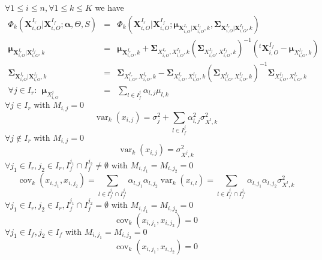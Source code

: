 \documentclass[11pt,a4paper]{report}
\begin{document}
		
		$\forall 1\leq i \leq n, \forall 1\leq k \leq K$ we have
\begin{eqnarray}
		\Phi_k(\boldsymbol{X}^{I_r}_{i,O}|\boldsymbol{X}^{I_f}_{i,O};\boldsymbol{\alpha},\Theta,S)&=&\Phi_k(\boldsymbol{X}^{I_r}_{i,O}|\boldsymbol{X}^{I_f}_{i,O};\boldsymbol{\mu}_{\boldsymbol{X}^{I_r}_{i,O}|\boldsymbol{X}^{I_f}_{i,O},k},\boldsymbol{\Sigma}_{\boldsymbol{X}^{I_r}_{i,O}|\boldsymbol{X}^{I_f}_{i,O},k})\\
		\boldsymbol{\mu}_{\boldsymbol{X}^{I_r}_{i,O}|\boldsymbol{X}^{I_f}_{i,O},k}&=& 
				\boldsymbol{\mu}_{\boldsymbol{X}^{I_r}_{i,O},k}+
				\boldsymbol{\Sigma}_{X_{i,O}^{I_r},X_{i,O}^{I_f},k}(\boldsymbol{\Sigma}_{X_{i,O}^{I_f},X_{i,O}^{I_f},k})^{-1}
				( ^t\boldsymbol{X}_{i,O}^{I_f}-\boldsymbol{\mu}_{X^{I_f}_{i,O},k})\\
		\boldsymbol{\Sigma}_{\boldsymbol{X}^{I_r}_{i,O}|\boldsymbol{X}^{I_f}_{i,O},k}&=&\boldsymbol{\Sigma}_{X_{i,O}^{I_r},X_{i,O}^{I_r},k}-\boldsymbol{\Sigma}_{X_{i,O}^{I_r},X_{i,O}^{I_f},k}
		(\boldsymbol{\Sigma}_{X_{i,O}^{I_f},X_{i,O}^{I_f},k})^{-1} \boldsymbol{\Sigma}_{X_{i,O}^{I_f},X_{i,O}^{I_r},k} \\
		\forall j \in I_r: \ \  \boldsymbol{\mu}_{X_{i,O}^{j}}&=&\sum_{l \in I_f^j}\alpha_{l,j}\mu_{l,k} 
\end{eqnarray}		
		$\forall j \in I_r \textrm{ with } M_{i,j}=0$ 
\begin{equation}
	\operatorname{var}_{k}(x_{i,j})=\sigma_{j}^2+ \sum_{l \in I_f^j} \alpha_{l,j}^2\sigma_{X^l,k}^2
\end{equation}			
	$\forall j \notin I_r \textrm{ with } M_{i,j}=0$
\begin{equation}
	\operatorname{var}_{k}(x_{i,j})=\sigma_{X^j,k}^2
\end{equation}			
	$\forall j_1 \in I_r, j_2 \in I_r,I_f^{j_1}\cap I_f^{j_2}\neq \emptyset \textrm{ with } M_{i,j_1}=M_{i,j_2}=0$
	\begin{equation}
	\operatorname{cov}_{k}(x_{i,j_1},x_{i,j_2})=\sum_{l\in I_f^{j_1}\cap I_f^{j_2}}\alpha_{l,j_1}\alpha_{l,j_2}\operatorname{var}_{k}(x_{i,l}) =\sum_{l\in I_f^{j_1}\cap I_f^{j_2}}\alpha_{l,j_1}\alpha_{l,j_2}\sigma_{X^l,k}^2
\end{equation}
	$\forall j_1 \in I_r, j_2 \in I_r,I_f^{j_1}\cap I_f^{j_2}= \emptyset \textrm{ with } M_{i,j_1}=M_{i,j_2}=0$
	\begin{equation}
	\operatorname{cov}_{k}(x_{i,j_1},x_{i,j_2})=0
\end{equation}
	$\forall j_1 \in I_f, j_2 \in I_f \textrm{ with } M_{i,j_1}=M_{i,j_2}=0$
	\begin{equation}
	\operatorname{cov}_{k}(x_{i,j_1},x_{i,j_2})=0
\end{equation}
\end{document}
